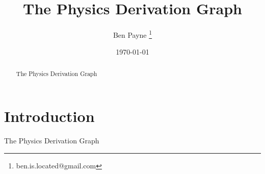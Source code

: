 \documentclass{article}
\title{The Physics Derivation Graph}
\author{Ben Payne \footnote{ben.is.located@gmail.com}}
\date{\today}
\newcommand{\pdg}{Physics Derivation Graph}
\begin{document}
\maketitle

\begin{abstract}
    The \pdg
\end{abstract}



\section{Introduction}

The \pdg
\end{document}
